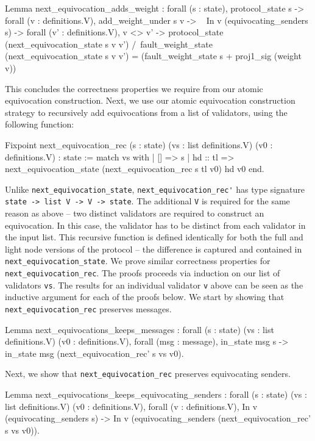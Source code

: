 \documentclass[runningheads]{llncs}
\begin{document}
\begin{coq}
	Lemma next_equivocation_adds_weight :
	forall (s : state),
	protocol_state s ->
	forall (v : definitions.V),
	add_weight_under s v ->
	~ In v (equivocating_senders s) -> 
	forall (v' : definitions.V),
	v <> v' ->
	protocol_state (next_equivocation_state s v v') /\
	fault_weight_state (next_equivocation_state s v v') =
	(fault_weight_state s + proj1_sig (weight v))%
\end{coq}	
This concludes the correctness properties we require from our atomic equivocation construction. Next, we use our atomic equivocation construction strategy to recursively add equivocations from a list of validators, using the following function: 
\begin{coq}
Fixpoint next_equivocation_rec (s : state) (vs : list definitions.V) (v0 : definitions.V) : state :=
	match vs with
	| [] => s
	| hd :: tl => next_equivocation_state (next_equivocation_rec s tl v0) hd v0
	end.
\end{coq}
Unlike \verb|next_equivocation_state|, \verb|next_equivocation_rec'| has type signature \verb|state -> list V -> V -> state|. The additional \verb|V| is required for the same reason as above -- two distinct validators are required to construct an equivocation. In this case, the validator has to be distinct from each validator in the input list. This recursive function is defined identically for both the full and light node versions of the protocol -- the difference is captured and contained in \verb|next_equivocation_state|. 
We prove similar correctness properties for \verb|next_equivocation_rec|. The proofs proceeds via induction on our list of validators \verb|vs|. The results for an individual validator \verb|v| above can be seen as the inductive argument for each of the proofs below. 
We start by showing that \verb|next_equivocation_rec| preserves messages. 
\begin{coq}
Lemma next_equivocations_keeps_messages :
	forall (s : state) (vs : list definitions.V) (v0 : definitions.V),
	forall (msg : message),
	in_state msg s ->
	in_state msg (next_equivocation_rec' s vs v0). 
\end{coq}
Next, we show that \verb|next_equivocation_rec| preserves equivocating senders. 
\begin{coq}
	Lemma next_equivocations_keeps_equivocating_senders :
	forall (s : state) (vs : list definitions.V) (v0 : definitions.V),
	forall (v : definitions.V),
	In v (equivocating_senders s) ->
	In v (equivocating_senders (next_equivocation_rec' s vs v0)).
\end{coq}
\end{document}
